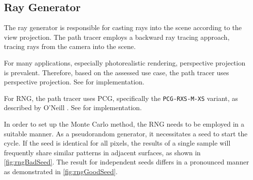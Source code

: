 \subsection*{Ray Generator}

The ray generator is responsible for casting rays into the scene according to the view projection. The path tracer employs a backward ray tracing approach, tracing rays from the camera into the scene.

For many applications, especially photorealistic rendering, perspective projection is prevalent. Therefore, based on the assessed use case, the path tracer uses perspective projection. See  for implementation.

For \gls{RNG}, the path tracer uses \gls{PCG}, specifically the \texttt{PCG-RXS-M-XS} variant, as described by O’Neill \cite{o2014pcg}. See  for implementation.

In order to set up the Monte Carlo method, the \gls{RNG} needs to be employed in a suitable manner. As a pseudorandom generator, it necessitates a seed to start the cycle. If the seed is identical for all pixels, the results of a single sample will frequently share similar patterns in adjacent surfaces, as shown in \autoref{fig:rngBadSeed}. The result for independent seeds differs in a pronounced manner as demonstrated in \autoref{fig:rngGoodSeed}.

